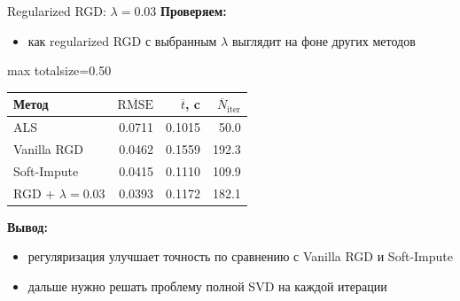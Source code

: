 \documentclass[aspectratio=169,xcolor=dvipsnames]{beamer}
\begin{document}
\begin{frame}{Regularized RGD: $\lambda = 0.03$}
\scriptsize
\textbf{Проверяем:}
\begin{itemize}
\item как regularized RGD с выбранным $\lambda$ выглядит на фоне других методов
\end{itemize}

\begin{center}
\begin{adjustbox}{max totalsize={\textwidth}{0.50\textheight}}
\begin{tabular}{lrrr}
\toprule
Метод & $\overline{\mathrm{RMSE}}$ & $\overline{t}$, c & $\overline{N}_{\mathrm{iter}}$ \\
\midrule
ALS & 0.0711 & 0.1015 & 50.0 \\
Vanilla RGD & 0.0462 & 0.1559 & 192.3 \\
Soft-Impute & 0.0415 & 0.1110 & 109.9 \\
\textcolor{green!50!black}{RGD + $\lambda = 0.03$} & \textcolor{green!50!black}{0.0393} & 0.1172 & 182.1 \\
\bottomrule
\end{tabular}
\end{adjustbox}
\end{center}

\textbf{Вывод:}
\begin{itemize}
\item регуляризация улучшает точность по сравнению с Vanilla RGD и Soft-Impute
\item дальше нужно решать проблему полной SVD на каждой итерации
\end{itemize}
\end{frame}
\end{document}
